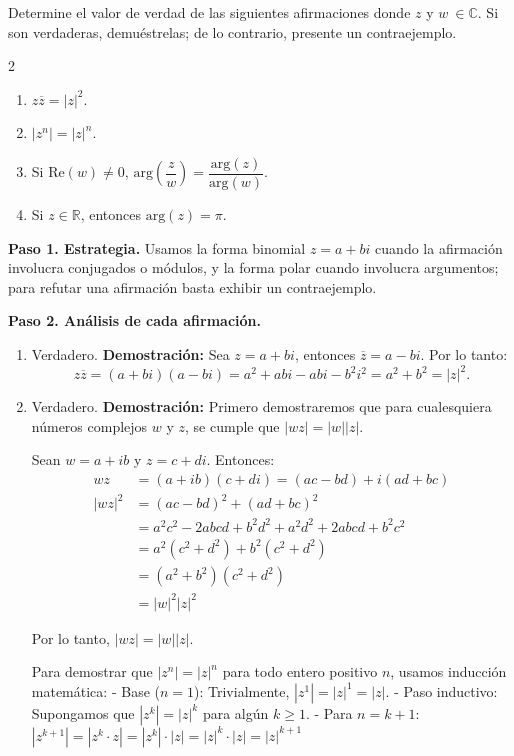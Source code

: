 \begin{prob} Determine el valor de verdad de las siguientes afirmaciones donde $z$ y $w\ \in \mathbb{C}$. Si son verdaderas, demuéstrelas; de lo contrario, presente un contraejemplo.

\begin{multicols}{2}
\begin{enumerate}[$a)$]
       \item $z\overline{z}=|z|^2$.
      \item  $|z^n|=|z|^n$.
      \item  Si $\text{Re}(w)\neq 0$, $\text{arg}\left(\dfrac{z}{w}\right)=\dfrac{\text{arg}(z)}{\text{arg}(w)}$.
      \item  Si $z\in\mathbb{R}$, entonces $\text{arg}(z)=\pi$.
\end{enumerate}
\end{multicols}

\begin{myproof}
\textbf{Paso 1. Estrategia.} Usamos la forma binomial $z=a+bi$ cuando la afirmación involucra conjugados o módulos, y la forma polar cuando involucra argumentos; para refutar una afirmación basta exhibir un contraejemplo.

\textbf{Paso 2. Análisis de cada afirmación.}
\begin{enumerate}[$a)$]
\item Verdadero. \textbf{Demostración:}
Sea $z=a+bi$, entonces $\overline{z}=a-bi$. Por lo tanto:
$$z\overline{z}= (a+bi)(a-bi)= a^2 + abi - abi - b^2i^2 = a^2 + b^2 = |z|^2.$$

\item Verdadero. \textbf{Demostración:} 
Primero demostraremos que para cualesquiera números complejos $w$ y $z$, se cumple que $|wz|=|w||z|$.

Sean $w=a+ib$ y $z=c+di$. Entonces:
\begin{align*}
wz &= (a+ib)(c+di) = (ac-bd) + i(ad+bc)\\
|wz|^2 &= (ac-bd)^2 + (ad+bc)^2\\
&= a^2c^2 - 2abcd + b^2d^2 + a^2d^2 + 2abcd + b^2c^2\\
&= a^2(c^2+d^2) + b^2(c^2+d^2)\\
&= (a^2+b^2)(c^2+d^2)\\
&= |w|^2|z|^2
\end{align*}

Por lo tanto, $|wz| = |w||z|$.

Para demostrar que $|z^n|=|z|^n$ para todo entero positivo $n$, usamos inducción matemática:
- Base ($n=1$): Trivialmente, $|z^1|=|z|^1=|z|$.
- Paso inductivo: Supongamos que $|z^k|=|z|^k$ para algún $k \geq 1$.
- Para $n=k+1$: $|z^{k+1}| = |z^k \cdot z| = |z^k| \cdot |z| = |z|^k \cdot |z| = |z|^{k+1}$


\end{enumerate}
\end{myproof}
\end{prob}
